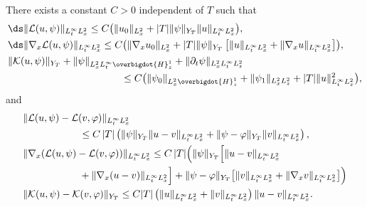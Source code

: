 \begin{lemma}\label{lemma_TC1}
There exists a constant $C>0$ independent of $T$ such that
\begin{subequations}
\begin{align}
\label{estimate_strichartz_1} &\ds\|\mathcal{L}(u,\psi)\|_{L_{t}^{\infty}L_{x}^{2}} \leq  C\bigl(\|u_{0}\|_{L_{x}^{2}}+|T|\|\psi\|_{Y_{T}}\|u\|_{L_{t}^{\infty}L_{x}^{2}}\bigr),\\
\label{estimate_strichartz_2} &\ds\|\nabla_{x}\mathcal{L}(u,\psi)\|_{L_{t}^{\infty}L_{x}^{2}} \leq  C\bigl(\|\nabla_{x}u_{0}\|_{L_{x}^{2}}+|T|\|\psi\|_{Y_{T}}\left[\|u\|_{L_{t}^{\infty}L_{x}^{2}}+\|\nabla_{x}u\|_{L_{t}^{\infty}L_{x}^{2}}\right]\bigr),\\
\label{estimate_strichartz_3}&
\|\mathcal{K}(u,\psi)\|_{Y_{T}}+\|\psi\|_{L_{x}^{2}L_{t}^{\infty}\overbigdot{H}_{z}^{1}}+\|\partial_{t}\psi\|_{L_{x}^{2}L_{t}^{\infty}L_{z}^{2}}\\
&\hspace*{4cm}\leq C\bigl(\|\psi_{0}\|_{L_{x}^{2}\overbigdot{H}_{z}^{1}}+\|\psi_{1}\|_{L_{x}^{2}L_{z}^{2}}+|T|\|u\|_{L_{t}^{\infty}L_{x}^{2}}^{2}\bigr),\notag
\end{align}
\end{subequations}
and
\begin{subequations}
\begin{align}
\label{estimate_strichartz_4} &\|\mathcal{L}(u,\psi)-\mathcal{L}(v,\varphi)\|_{L_{t}^{\infty}L_{x}^{2}}\\
&\hspace*{2cm}\leq  C\,|T|\left(\|\psi\|_{Y_{T}}\|u-v\|_{L_{t}^{\infty}L_{x}^{2}}+\|\psi-\varphi\|_{Y_{T}}\|v\|_{L_{t}^{\infty}L_{x}^{2}}\right),\notag\\
\label{estimate_strichartz_5}&
\|\nabla_{x}(\mathcal{L}(u,\psi)-\mathcal{L}(v,\varphi))\|_{L_{t}^{\infty}L_{x}^{2}} \leq  C\,|T|\Bigl(\|\psi\|_{Y_{T}}\Bigl[\|u-v\|_{L_{t}^{\infty}L_{x}^{2}}\\
&\hspace*{2cm}+\|\nabla_{x}(u-v)\|_{L_{t}^{\infty}L_{x}^{2}} \Bigr]+\|\psi-\varphi\|_{Y_{T}}\bigl[\|v\|_{L_{t}^{\infty}L_{x}^{2}}+\|\nabla_{x}v\|_{L_{t}^{\infty}L_{x}^{2}}\bigr]\Bigr)\notag
\\
\label{estimate_strichartz_6}
&\|\mathcal{K}(u,\psi)-\mathcal{K}(v,\varphi)\|_{Y_{T}} \leq  C|T|\left(\|u\|_{L_{t}^{\infty}L_{x}^{2}}+\|v\|_{L_{t}^{\infty}L_{x}^{2}}\right)\|u-v\|_{L_{t}^{\infty}L_{x}^{2}}.
\end{align}
\end{subequations}
\end{lemma}

